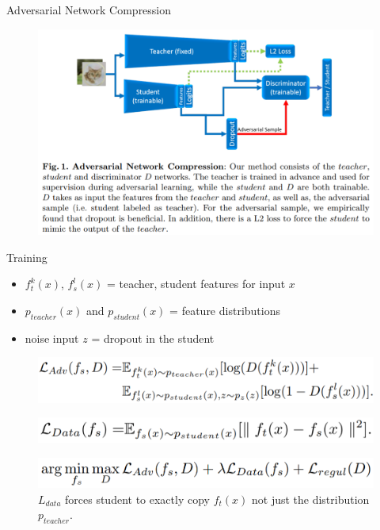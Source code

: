 \documentclass{beamer}
\begin{document}
\begin{frame}{Adversarial Network Compression}

\begin{figure}[h]
\includegraphics[width=\textwidth]{img/GAN_distill}
\end{figure}

\end{frame}
\begin{frame}{Training}

\begin{itemize}
\item $f_t^k(x)$, $f_s^l(x)$ = teacher, student features for input $x$
\item $p_{teacher}(x)$ and $p_{student}(x)$ = feature distributions
\item noise input $z$ = dropout in the student
\end{itemize}

\begin{figure}[h]
\includegraphics[scale=0.5]{img/GAN_distill_train}
\end{figure}

\begin{figure}[h]
\includegraphics[scale=0.4]{img/l_data}
\end{figure}

\begin{figure}[h]
\includegraphics[scale=0.35]{img/argmin}
\caption{$L_{data}$ forces student to exactly copy $f_t(x)$ not just the distribution $p_{teacher}$.}
\end{figure}

\end{frame}
\end{document}
